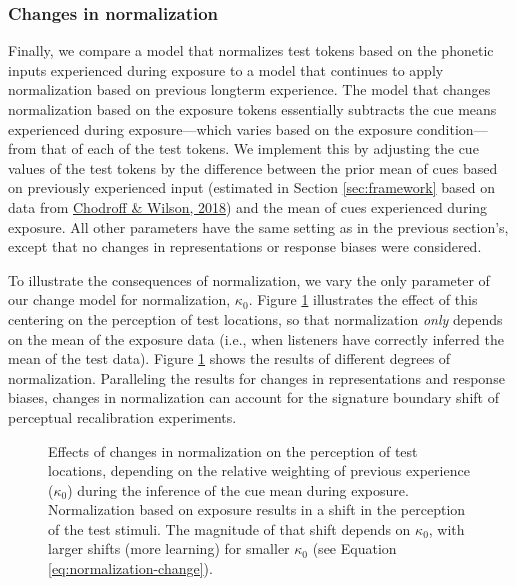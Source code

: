\documentclass[
  11pt,
  man,floatsintext]{apa6}
\begin{document}
\hypertarget{changes-in-normalization}{%
\subsubsection{Changes in normalization}\label{changes-in-normalization}}

Finally, we compare a model that normalizes test tokens based on the phonetic inputs experienced during exposure to a model that continues to apply normalization based on previous longterm experience. The model that changes normalization based on the exposure tokens essentially subtracts the cue means experienced during exposure---which varies based on the exposure condition---from that of each of the test tokens. We implement this by adjusting the cue values of the test tokens by the difference between the prior mean of cues based on previously experienced input (estimated in Section \ref{sec:framework} based on data from \protect\hyperlink{ref-chodroff-wilson2018}{Chodroff \& Wilson, 2018}) and the mean of cues experienced during exposure. All other parameters have the same setting as in the previous section's, except that no changes in representations or response biases were considered.

To illustrate the consequences of normalization, we vary the only parameter of our change model for normalization, \(\kappa_0\). Figure \ref{fig:PR-test-normalization} illustrates the effect of this centering on the perception of test locations, so that normalization \emph{only} depends on the mean of the exposure data (i.e., when listeners have correctly inferred the mean of the test data). Figure \ref{fig:PR-test-normalization} shows the results of different degrees of normalization. Paralleling the results for changes in representations and response biases, changes in normalization can account for the signature boundary shift of perceptual recalibration experiments.



\begin{figure}

{\centering {}

}

\caption[Effects of changes in normalization on the perception of test locations, depending on the relative weighting of previous experience (\(\kappa_0\)) during the inference of the cue mean during exposure. Normalization based on exposure results in a shift in the perception of the test stimuli. The magnitude of that shift depends on \(\kappa_0\), with larger shifts (more learning) for smaller \(\kappa_0\) (see Equation \eqref{eq:normalization-change}).]{Effects of changes in normalization on the perception of test locations, depending on the relative weighting of previous experience (\(\kappa_0\)) during the inference of the cue mean during exposure. Normalization based on exposure results in a shift in the perception of the test stimuli. The magnitude of that shift depends on \(\kappa_0\), with larger shifts (more learning) for smaller \(\kappa_0\) (see Equation \eqref{eq:normalization-change}).}\label{fig:PR-test-normalization}
\end{figure}
\end{document}
